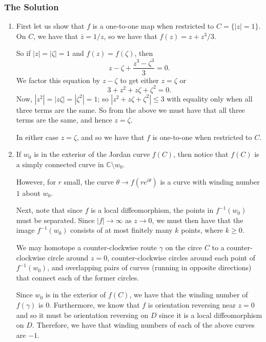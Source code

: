 \subsubsection*{The Solution}
\begin{enumerate}
\item First let us show that \(f\) is a one-to-one map when restricted to \(C = \{|z| = 1\}\). On \(C\),
we have that \(\bar z = 1 / z\), so we have that \(f(z) = z + z^3 / 3\). 

So if \(|z| = |\zeta| = 1\) and \(f(z) = f(\zeta)\), then 
\begin{equation}
z - \zeta + \frac{z^3 - \zeta^3}{3} = 0. 
\end{equation}
We factor this equation by \(z - \zeta\) to get either \(z =\zeta\) or
\begin{equation}
3 + z^2 + z\zeta + \zeta^2 = 0.
\end{equation}
Now, \(|z^2| = |z\zeta| = |\zeta^2| = 1\); so \(|z^2 + z\zeta + \zeta^2| \leq 3\) with equality only when
all three terms are the same. So from the above we must have that all three terms are the same, and hence
\(z = \zeta\).

In either case \(z = \zeta\), and so we have that \(f\) is one-to-one when restricted to \(C\).

\item If \(w_0\) is in the exterior of the Jordan curve \(f(C)\), then notice that \(f(C)\) is a simply connected
curve in \(\mathbb C\setminus{w_0}\). 

However, for \(r\) small, the curve \(\theta \to f(re^{i\theta})\) is a curve with winding number \(1\) about
\(w_0\). 

Next, note that since \(f\) is a local diffeomorphism, the points in \(f^{-1}(w_0)\) must be separated. Since
\(|f| \to \infty\) as \(z \to 0\), we must then have that the image \(f^{-1}(w_0)\) consists of at
most finitely many \(k\) points, where \(k \geq 0\). 

We may homotope a counter-clockwise route \(\gamma\) on the circe \(C\) to a counter-clockwise circle around \(z = 0\),
counter-clockwise circles around each point of \(f^{-1}(w_0)\), and overlapping pairs of curves (running in 
opposite directions) that connect each of the former circles.

Since \(w_0\) is in the exterior of \(f(C)\), we have that the winding number of \(f(\gamma)\) is \(0\).
Furthermore, we know that \(f\) is orientation reversing near \(z = 0\) and so it must be orientation reversing on
\(D\) since it is a local diffeomorphism on \(D\). Therefore, we have that winding numbers of 
each of the above curves are \(-1\).


\end{enumerate}
